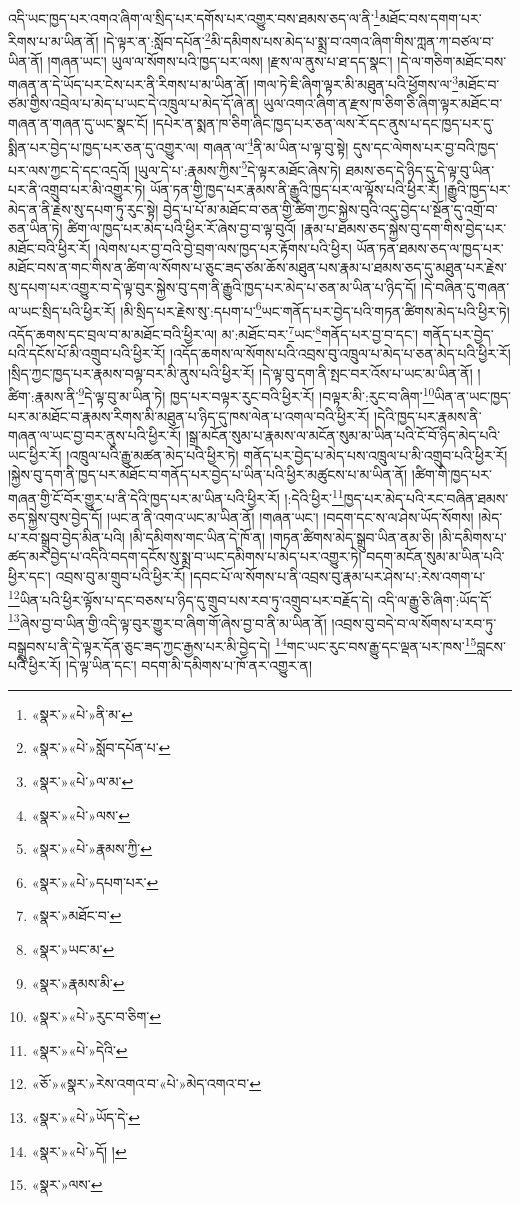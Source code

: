 འདི་ཡང་ཁྱད་པར་འགའ་ཞིག་ལ་སྲིད་པར་དགོས་པར་འགྱུར་བས་ཐམས་ཅད་ལ་ནི་\footnote{«སྣར་»«པེ་»ནི་མ་}མཐོང་བས་དགག་པར་རིགས་པ་མ་ཡིན་ནོ། །དེ་ལྟར་ན་:སློབ་དཔོན་\footnote{«སྣར་»«པེ་»སློབ་དཔོན་པ་}མི་དམིགས་པས་མེད་པ་སྨྲ་བ་འགའ་ཞིག་གིས་ཀླན་ཀ་བཙལ་བ་ཡིན་ནོ། །གཞན་ཡང་། ཡུལ་ལ་སོགས་པའི་ཁྱད་པར་ལས། །རྫས་ལ་ནུས་པ་ཐ་དད་སྣང་། །དེ་ལ་གཅིག་མཐོང་བས་གཞན་ན་དེ་ཡོད་པར་ངེས་པར་ནི་རིགས་པ་མ་ཡིན་ནོ། །གལ་ཏེ་ཇི་ཞིག་ལྟར་མི་མཐུན་པའི་ཕྱོགས་ལ་\footnote{«སྣར་»«པེ་»ལ་མ་}མཐོང་བ་ཙམ་གྱིས་འབྲེལ་པ་མེད་པ་ཡང་དེ་འཁྲུལ་པ་མེད་དོ་ཞེ་ན། ཡུལ་འགའ་ཞིག་ན་རྫས་ཁ་ཅིག་ཅི་ཞིག་ལྟར་མཐོང་བ་གཞན་ན་གཞན་དུ་ཡང་སྣང་ངོ། །དཔེར་ན་སྨན་ཁ་ཅིག་ཞིང་ཁྱད་པར་ཅན་ལས་རོ་དང་ནུས་པ་དང་ཁྱད་པར་དུ་སྨིན་པར་བྱེད་པ་ཁྱད་པར་ཅན་དུ་འགྱུར་ལ། གཞན་ལ་\footnote{«སྣར་»«པེ་»ལས་}ནི་མ་ཡིན་པ་ལྟ་བུ་སྟེ། དུས་དང་ལེགས་པར་བྱ་བའི་ཁྱད་པར་ལས་ཀྱང་དེ་དང་འདྲའོ། །ཡུལ་དེ་པ་:རྣམས་ཀྱིས་\footnote{«སྣར་»«པེ་»རྣམས་ཀྱི་}དེ་ལྟར་མཐོང་ཞེས་ཏེ། ཐམས་ཅད་དེ་ཉིད་དུ་དེ་ལྟ་བུ་ཡིན་པར་ནི་འགྲུབ་པར་མི་འགྱུར་ཏེ། ཡོན་ཏན་གྱི་ཁྱད་པར་རྣམས་ནི་རྒྱུའི་ཁྱད་པར་ལ་ལྟོས་པའི་ཕྱིར་རོ། །རྒྱུའི་ཁྱད་པར་མེད་ན་ནི་རྗེས་སུ་དཔག་ཏུ་རུང་སྟེ། བྱེད་པ་པོ་མ་མཐོང་བ་ཅན་གྱི་ཚིག་ཀྱང་སྐྱེས་བུའི་འདུ་བྱེད་པ་སྔོན་དུ་འགྲོ་བ་ཅན་ཡིན་ཏེ། ཚིག་ལ་ཁྱད་པར་མེད་པའི་ཕྱིར་རོ་ཞེས་བྱ་བ་ལྟ་བུའོ། །རྣམ་པ་ཐམས་ཅད་སྐྱེས་བུ་དག་གིས་བྱེད་པར་མཐོང་བའི་ཕྱིར་རོ། །ལེགས་པར་བྱ་བའི་བྱེ་བྲག་ལས་ཁྱད་པར་རྟོགས་པའི་ཕྱིར། ཡོན་ཏན་ཐམས་ཅད་ལ་ཁྱད་པར་མཐོང་བས་ན་གང་གིས་ན་ཚིག་ལ་སོགས་པ་ཅུང་ཟད་ཙམ་ཆོས་མཐུན་པས་རྣམ་པ་ཐམས་ཅད་དུ་མཐུན་པར་རྗེས་སུ་དཔག་པར་འགྱུར་བ་དེ་ལྟ་བུར་སྐྱེས་བུ་དག་ནི་རྒྱུའི་ཁྱད་པར་མེད་པ་ཅན་མ་ཡིན་པ་ཉིད་དོ། །དེ་བཞིན་དུ་གཞན་ལ་ཡང་སྲིད་པའི་ཕྱིར་རོ། །མི་སྲིད་པར་རྗེས་སུ་:དཔག་པ་\footnote{«སྣར་»«པེ་»དཔག་པར་}ཡང་གནོད་པར་བྱེད་པའི་གཏན་ཚིགས་མེད་པའི་ཕྱིར་ཏེ། འདོད་ཆགས་དང་བྲལ་བ་མ་མཐོང་བའི་ཕྱིར་ལ། མ་:མཐོང་བར་\footnote{«སྣར་»མཐོང་བ་}ཡང་\footnote{«སྣར་»ཡང་མ་}གནོད་པར་བྱ་བ་དང་། གནོད་པར་བྱེད་པའི་དངོས་པོ་མི་འགྲུབ་པའི་ཕྱིར་རོ། །འདོད་ཆགས་ལ་སོགས་པའི་འབྲས་བུ་འཁྲུལ་པ་མེད་པ་ཅན་མེད་པའི་ཕྱིར་རོ། །སྲིད་ཀྱང་ཁྱད་པར་རྣམས་བལྟ་བར་མི་ནུས་པའི་ཕྱིར་རོ། །དེ་ལྟ་བུ་དག་ནི་སྤང་བར་འོས་པ་ཡང་མ་ཡིན་ནོ། །ཚིག་:རྣམས་ནི་\footnote{«སྣར་»རྣམས་མི་}དེ་ལྟ་བུ་མ་ཡིན་ཏེ། ཁྱད་པར་བལྟར་རུང་བའི་ཕྱིར་རོ། །བལྟར་མི་:རུང་བ་ཞིག་\footnote{«སྣར་»«པེ་»རུང་བ་ཅིག་}ཡིན་ན་ཡང་ཁྱད་པར་མ་མཐོང་བ་རྣམས་རིགས་མི་མཐུན་པ་ཉིད་དུ་ཁས་ལེན་པ་འགལ་བའི་ཕྱིར་རོ། །དེའི་ཁྱད་པར་རྣམས་ནི་གཞན་ལ་ཡང་བྱ་བར་ནུས་པའི་ཕྱིར་རོ། །སྒྲ་མངོན་སུམ་པ་རྣམས་ལ་མངོན་སུམ་མ་ཡིན་པའི་ངོ་བོ་ཉིད་མེད་པའི་ཡང་ཕྱིར་རོ། །འཁྲུལ་པའི་རྒྱུ་མཚན་མེད་པའི་ཕྱིར་ཏེ། གནོད་པར་བྱེད་པ་མེད་པས་འཁྲུལ་པ་མི་འགྲུབ་པའི་ཕྱིར་རོ། །སྐྱེས་བུ་དག་ནི་ཁྱད་པར་མཐོང་བ་གནོད་པར་བྱེད་པ་ཡིན་པའི་ཕྱིར་མཚུངས་པ་མ་ཡིན་ནོ། །ཚིག་གི་ཁྱད་པར་གཞན་གྱི་ངོ་བོར་གྱུར་པ་ནི་དེའི་ཁྱད་པར་མ་ཡིན་པའི་ཕྱིར་རོ། །:དེའི་ཕྱིར་\footnote{«སྣར་»«པེ་»དེའི་}ཁྱད་པར་མེད་པའི་རང་བཞིན་ཐམས་ཅད་སྐྱེས་བུས་བྱེད་དོ། །ཡང་ན་ནི་འགའ་ཡང་མ་ཡིན་ནོ། །གཞན་ཡང་། །བདག་དང་ས་ལ་ཤེས་ཡོད་སོགས། །མེད་པ་རབ་སྒྲུབ་བྱེད་མིན་པའི། །མི་དམིགས་གང་ཡིན་དེ་ཁོ་ན། །གཏན་ཚིགས་མེད་སྒྲུབ་ཡིན་ནམ་ཅི། །མི་དམིགས་པ་ཚད་མར་བྱེད་པ་འདིའི་བདག་དངོས་སུ་སྨྲ་བ་ཡང་དམིགས་པ་མེད་པར་འགྱུར་ཏེ། བདག་མངོན་སུམ་མ་ཡིན་པའི་ཕྱིར་དང་། འབྲས་བུ་མ་གྲུབ་པའི་ཕྱིར་རོ། །དབང་པོ་ལ་སོགས་པ་ནི་འབྲས་བུ་རྣམ་པར་ཤེས་པ་:རེས་འགག་པ་\footnote{«ཅོ་»«སྣར་»རེས་འགའ་བ་«པེ་»མེད་འགའ་བ་}ཡིན་པའི་ཕྱིར་ལྟོས་པ་དང་བཅས་པ་ཉིད་དུ་གྲུབ་པས་རབ་ཏུ་འགྲུབ་པར་བརྗོད་དེ། འདི་ལ་རྒྱུ་ཅི་ཞིག་:ཡོད་དོ་\footnote{«སྣར་»«པེ་»ཡོད་དེ་}ཞེས་བྱ་བ་ཡིན་གྱི་འདི་ལྟ་བུར་གྱུར་བ་ཞིག་གོ་ཞེས་བྱ་བ་ནི་མ་ཡིན་ནོ། །འབྲས་བུ་བདེ་བ་ལ་སོགས་པ་རབ་ཏུ་བསྒྲུབས་པ་ནི་དེ་ལྟར་དོན་ཅུང་ཟད་ཀྱང་རྒྱས་པར་མི་བྱེད་དེ། \footnote{«སྣར་»«པེ་»དོ། ། }གང་ཡང་རུང་བས་རྒྱུ་དང་ལྡན་པར་ཁས་\footnote{«སྣར་»ལས་}བླངས་པའི་ཕྱིར་རོ། །དེ་ལྟ་ཡིན་དང་། བདག་མི་དམིགས་པ་ཁོ་ནར་འགྱུར་ན། 